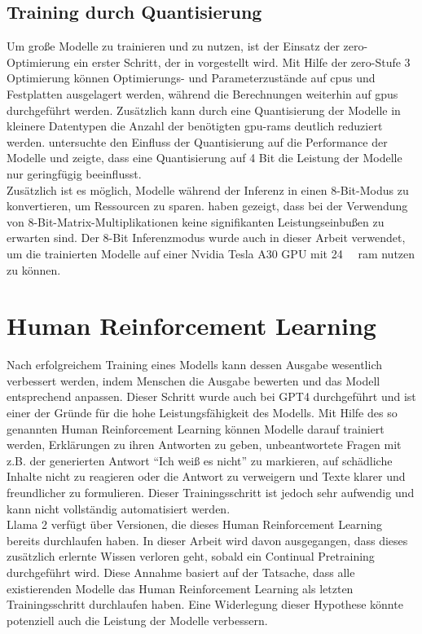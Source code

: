 \subsection{Training durch Quantisierung}
Um große Modelle zu trainieren und zu nutzen, ist der Einsatz der \ac{zero}-Optimierung ein erster Schritt, der in \citet{deepspeed} vorgestellt wird.
Mit Hilfe der \ac{zero}-Stufe 3 Optimierung können Optimierungs- und Parameterzustände auf \ac{cpu}s und Festplatten ausgelagert werden, während die Berechnungen weiterhin auf \ac{gpu}s durchgeführt werden.
Zusätzlich kann durch eine Quantisierung der Modelle in kleinere Datentypen die Anzahl der benötigten \ac{gpu}-\ac{ram}s deutlich reduziert werden.
\citet{4bit} untersuchte den Einfluss der Quantisierung auf die Performance der Modelle und zeigte, dass eine Quantisierung auf 4 Bit die Leistung der Modelle nur geringfügig beeinflusst.\\

Zusätzlich ist es möglich, Modelle während der Inferenz in einen 8-Bit-Modus zu konvertieren, um Ressourcen zu sparen.
\citet{8bit-inference} haben gezeigt, dass bei der Verwendung von 8-Bit-Matrix-Multiplikationen keine signifikanten Leistungseinbußen zu erwarten sind.
Der 8-Bit Inferenzmodus wurde auch in dieser Arbeit verwendet, um die trainierten Modelle auf einer Nvidia Tesla A30 GPU mit \SI{24}{\giga\byte} \ac{ram} nutzen zu können.\\

\section{Human Reinforcement Learning}
Nach erfolgreichem Training eines Modells kann dessen Ausgabe wesentlich verbessert werden, indem Menschen die Ausgabe bewerten und das Modell entsprechend anpassen.
Dieser Schritt wurde auch bei GPT4 durchgeführt und ist einer der Gründe für die hohe Leistungsfähigkeit des Modells.
Mit Hilfe des so genannten Human Reinforcement Learning können Modelle darauf trainiert werden, Erklärungen zu ihren Antworten zu geben, unbeantwortete Fragen mit z.B. der generierten Antwort \enquote{Ich weiß es nicht} zu markieren, auf schädliche Inhalte nicht zu reagieren oder die Antwort zu verweigern und Texte klarer und freundlicher zu formulieren.
Dieser Trainingsschritt ist jedoch sehr aufwendig und kann nicht vollständig automatisiert werden.\\

Llama 2 verfügt über Versionen, die dieses Human Reinforcement Learning bereits durchlaufen haben.
In dieser Arbeit wird davon ausgegangen, dass dieses zusätzlich erlernte Wissen verloren geht, sobald ein Continual Pretraining durchgeführt wird.
Diese Annahme basiert auf der Tatsache, dass alle existierenden Modelle das Human Reinforcement Learning als letzten Trainingsschritt durchlaufen haben.
Eine Widerlegung dieser Hypothese könnte potenziell auch die Leistung der Modelle verbessern.

